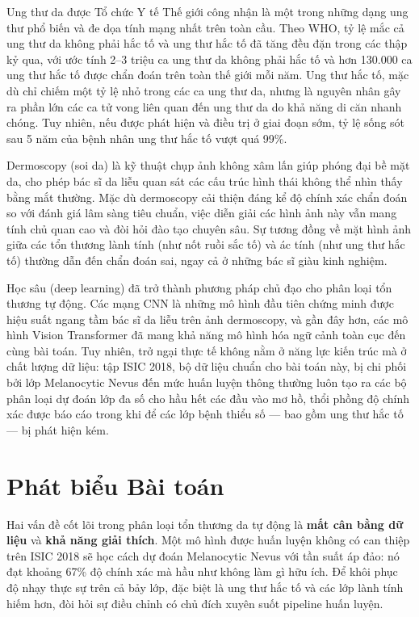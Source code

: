 \documentclass[11pt,a4paper]{report}
\begin{document}
Ung thư da được Tổ chức Y tế Thế giới công nhận là một trong những dạng ung thư phổ biến và đe dọa tính mạng nhất trên toàn cầu. Theo WHO, tỷ lệ mắc cả ung thư da không phải hắc tố và ung thư hắc tố đã tăng đều đặn trong các thập kỷ qua, với ước tính 2--3 triệu ca ung thư da không phải hắc tố và hơn 130.000 ca ung thư hắc tố được chẩn đoán trên toàn thế giới mỗi năm. Ung thư hắc tố, mặc dù chỉ chiếm một tỷ lệ nhỏ trong các ca ung thư da, nhưng là nguyên nhân gây ra phần lớn các ca tử vong liên quan đến ung thư da do khả năng di căn nhanh chóng. Tuy nhiên, nếu được phát hiện và điều trị ở giai đoạn sớm, tỷ lệ sống sót sau 5 năm của bệnh nhân ung thư hắc tố vượt quá 99\%.

Dermoscopy (soi da) là kỹ thuật chụp ảnh không xâm lấn giúp phóng đại bề mặt da, cho phép bác sĩ da liễu quan sát các cấu trúc hình thái không thể nhìn thấy bằng mắt thường. Mặc dù dermoscopy cải thiện đáng kể độ chính xác chẩn đoán so với đánh giá lâm sàng tiêu chuẩn, việc diễn giải các hình ảnh này vẫn mang tính chủ quan cao và đòi hỏi đào tạo chuyên sâu. Sự tương đồng về mặt hình ảnh giữa các tổn thương lành tính (như nốt ruồi sắc tố) và ác tính (như ung thư hắc tố) thường dẫn đến chẩn đoán sai, ngay cả ở những bác sĩ giàu kinh nghiệm.

Học sâu (deep learning) đã trở thành phương pháp chủ đạo cho phân loại tổn thương tự động. Các mạng CNN là những mô hình đầu tiên chứng minh được hiệu suất ngang tầm bác sĩ da liễu trên ảnh dermoscopy, và gần đây hơn, các mô hình Vision Transformer đã mang khả năng mô hình hóa ngữ cảnh toàn cục đến cùng bài toán. Tuy nhiên, trở ngại thực tế không nằm ở năng lực kiến trúc mà ở chất lượng dữ liệu: tập ISIC 2018, bộ dữ liệu chuẩn cho bài toán này, bị chi phối bởi lớp Melanocytic Nevus đến mức huấn luyện thông thường luôn tạo ra các bộ phân loại dự đoán lớp đa số cho hầu hết các đầu vào mơ hồ, thổi phồng độ chính xác được báo cáo trong khi để các lớp bệnh thiểu số --- bao gồm ung thư hắc tố --- bị phát hiện kém.

\section{Phát biểu Bài toán}

Hai vấn đề cốt lõi trong phân loại tổn thương da tự động là \textbf{mất cân bằng dữ liệu} và \textbf{khả năng giải thích}. Một mô hình được huấn luyện không có can thiệp trên ISIC 2018 sẽ học cách dự đoán Melanocytic Nevus với tần suất áp đảo: nó đạt khoảng 67\% độ chính xác mà hầu như không làm gì hữu ích. Để khôi phục độ nhạy thực sự trên cả bảy lớp, đặc biệt là ung thư hắc tố và các lớp lành tính hiếm hơn, đòi hỏi sự điều chỉnh có chủ đích xuyên suốt pipeline huấn luyện.
\end{document}
